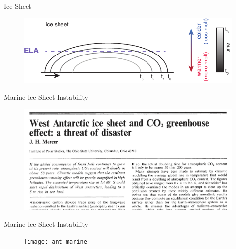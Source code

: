 \documentclass[hide notes,intlimits]{beamer}
\begin{document}
\begin{frame}{Ice Sheet}
 \begin{figure}
    \includegraphics[width=\textwidth]{bodvardsson-effect_ice_sheet}
  \end{figure}
\end{frame}


\begin{frame}{Marine Ice Sheet Instability}
 \begin{figure}
    \includegraphics[width=\textwidth]{mercer_1978}
  \end{figure}
\end{frame}

\begin{frame}{Marine Ice Sheet Instability}
 \begin{figure}
    \texttt{[image: ant-marine]}
  \end{figure}
\end{frame}

  {
}
\end{document}
